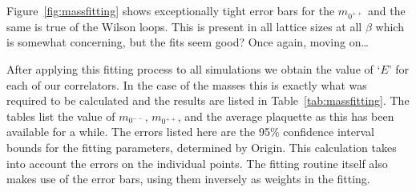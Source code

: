 \documentclass[12pt]{article}
\begin{document}
Figure~\ref{fig:massfitting} shows exceptionally tight error bars for the $m_{0^{++}}$ and the same is true of the Wilson loops. This is present in all lattice sizes at all $\beta$ which is somewhat concerning, but the fits seem good? Once again, moving on\ldots

\par After applying this fitting process to all simulations we obtain the value of `$E$' for each of our correlators. In the case of the masses this is exactly what was required to be calculated and the results are listed in Table~\ref{tab:massfitting}. The tables list the value of $m_{0^{--}}$, $m_{0^{++}}$, and the average plaquette as this has been available for a while. The errors listed here are the 95\% confidence interval bounds for the fitting parameters, determined by Origin. This calculation takes into account the errors on the individual points. The fitting routine itself also makes use of the error bars, using them inversely as weights in the fitting.
\end{document}

